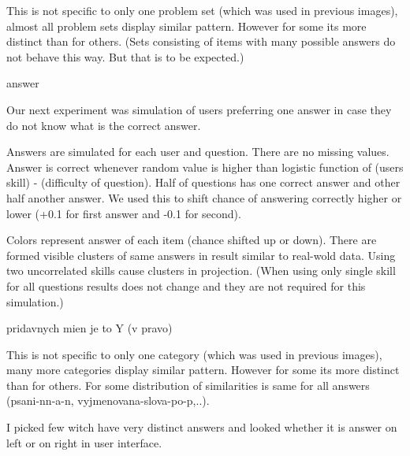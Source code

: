 \documentclass[
  digital, %
  table,   %
  nolof,     %
  nolot,     %
  nocover
]{fithesis3}
\begin{document}


This is not specific to only one problem set (which was used in previous
images), almost all problem sets display similar pattern. However for
some its more distinct than for others. (Sets consisting of items with
many possible answers do not behave this way. But that is to be
expected.)

answer

Our next experiment was simulation of users preferring one answer in
case they do not know what is the correct answer.

Answers are simulated for each user and question. There are no missing
values. Answer is correct whenever random value is higher than logistic
function of (users skill) - (difficulty of question). Half of questions
has one correct answer and other half another answer. We used this to
shift chance of answering correctly higher or lower (+0.1 for first
answer and -0.1 for second).


Colors represent answer of each item (chance shifted up or down). There
are formed visible clusters of same answers in result similar to
real-wold data. Using two uncorrelated skills cause clusters in
projection. (When using only single skill for all questions results does
not change and they are not required for this simulation.)

pridavnych mien je to Y (v pravo)

This is not specific to only one category (which was used in previous
images), many more categories display similar pattern. However for some
its more distinct than for others. For some distribution of similarities
is same for all answers (psani-nn-a-n, vyjmenovana-slova-po-p,..).

I picked few witch have very distinct answers and looked whether it is
answer on left or on right in user interface.
\end{document}
